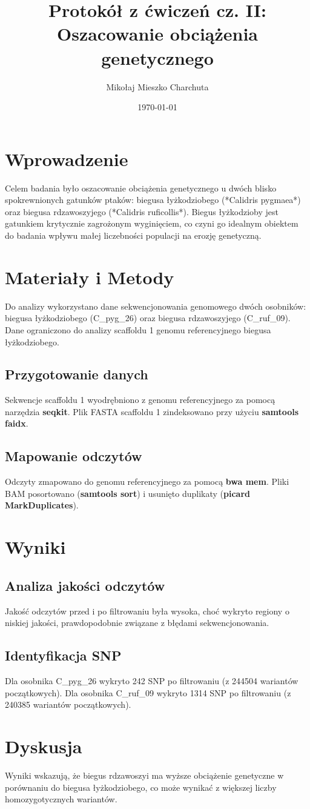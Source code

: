 \documentclass[a4paper, 12pt]{article}
\title{Protokół z ćwiczeń cz. II: Oszacowanie obciążenia genetycznego}
\author{Mikołaj Mieszko Charchuta}
\date{\today}
\begin{document}
\maketitle

\section{Wprowadzenie}
Celem badania było oszacowanie obciążenia genetycznego u dwóch blisko spokrewnionych gatunków ptaków: biegusa łyżkodziobego (*Calidris pygmaea*) oraz biegusa rdzawoszyjego (*Calidris ruficollis*). Biegus łyżkodzioby jest gatunkiem krytycznie zagrożonym wyginięciem, co czyni go idealnym obiektem do badania wpływu małej liczebności populacji na erozję genetyczną.

\section{Materiały i Metody}
Do analizy wykorzystano dane sekwencjonowania genomowego dwóch osobników: biegusa łyżkodziobego (C\_pyg\_26) oraz biegusa rdzawoszyjego (C\_ruf\_09). Dane ograniczono do analizy scaffoldu 1 genomu referencyjnego biegusa łyżkodziobego.

\subsection{Przygotowanie danych}
Sekwencje scaffoldu 1 wyodrębniono z genomu referencyjnego za pomocą narzędzia \textbf{seqkit}. Plik FASTA scaffoldu 1 zindeksowano przy użyciu \textbf{samtools faidx}.

\subsection{Mapowanie odczytów}
Odczyty zmapowano do genomu referencyjnego za pomocą \textbf{bwa mem}. Pliki BAM posortowano (\textbf{samtools sort}) i usunięto duplikaty (\textbf{picard MarkDuplicates}).

\section{Wyniki}
\subsection{Analiza jakości odczytów}
Jakość odczytów przed i po filtrowaniu była wysoka, choć wykryto regiony o niskiej jakości, prawdopodobnie związane z błędami sekwencjonowania.

\subsection{Identyfikacja SNP}
Dla osobnika C\_pyg\_26 wykryto 242 SNP po filtrowaniu (z 244504 wariantów początkowych). Dla osobnika C\_ruf\_09 wykryto 1314 SNP po filtrowaniu (z 240385 wariantów początkowych).

\section{Dyskusja}
Wyniki wskazują, że biegus rdzawoszyi ma wyższe obciążenie genetyczne w porównaniu do biegusa łyżkodziobego, co może wynikać z większej liczby homozygotycznych wariantów.
\end{document}
